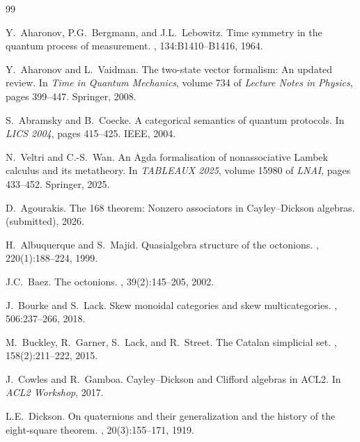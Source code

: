 \documentclass[11pt,a4paper]{article}
\theoremstyle{definition}
\theoremstyle{remark}
\begin{document}

\begin{thebibliography}{99}

Y.~Aharonov, P.G.~Bergmann, and J.L.~Lebowitz.
\newblock Time symmetry in the quantum process of measurement.
, 134:B1410--B1416, 1964.

Y.~Aharonov and L.~Vaidman.
\newblock The two-state vector formalism: An updated review.
\newblock In {\em Time in Quantum Mechanics}, volume 734 of {\em Lecture Notes
  in Physics}, pages 399--447. Springer, 2008.

S.~Abramsky and B.~Coecke.
\newblock A categorical semantics of quantum protocols.
\newblock In {\em LICS 2004}, pages 415--425. IEEE, 2004.

N.~Veltri and C.-S.~Wan.
\newblock An {A}gda formalisation of nonassociative {L}ambek calculus and its metatheory.
\newblock In {\em TABLEAUX 2025}, volume 15980 of {\em LNAI}, pages 433--452. Springer, 2025.

D.~Agourakis.
\newblock The 168 theorem: Nonzero associators in {C}ayley--{D}ickson algebras.
 (submitted), 2026.

H.~Albuquerque and S.~Majid.
\newblock Quasialgebra structure of the octonions.
, 220(1):188--224, 1999.

J.C.~Baez.
\newblock The octonions.
,
  39(2):145--205, 2002.

J.~Bourke and S.~Lack.
\newblock Skew monoidal categories and skew multicategories.
, 506:237--266, 2018.

M.~Buckley, R.~Garner, S.~Lack, and R.~Street.
\newblock The {C}atalan simplicial set.
, 158(2):211--222, 2015.

J.~Cowles and R.~Gamboa.
\newblock Cayley--{D}ickson and {C}lifford algebras in {ACL2}.
\newblock In {\em ACL2 Workshop}, 2017.

L.E.~Dickson.
\newblock On quaternions and their generalization and the history of the
  eight-square theorem.
, 20(3):155--171, 1919.


\end{thebibliography}
\end{document}
